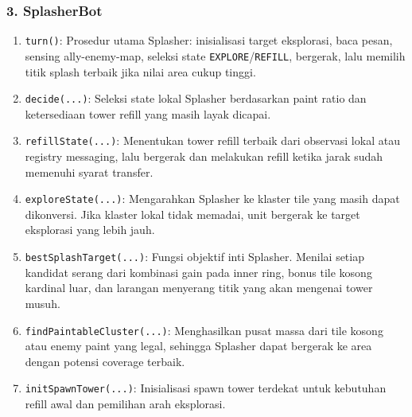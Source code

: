 \subsubsection{3. SplasherBot}
\begin{enumerate}
	\item \texttt{turn()}:
	      Prosedur utama Splasher: inisialisasi target eksplorasi, baca pesan, sensing ally-enemy-map, seleksi state \texttt{EXPLORE}/\texttt{REFILL}, bergerak, lalu memilih titik splash terbaik jika nilai area cukup tinggi.

	\item \texttt{decide(...)}:
	      Seleksi state lokal Splasher berdasarkan paint ratio dan ketersediaan tower refill yang masih layak dicapai.

	\item \texttt{refillState(...)}:
	      Menentukan tower refill terbaik dari observasi lokal atau registry messaging, lalu bergerak dan melakukan refill ketika jarak sudah memenuhi syarat transfer.

	\item \texttt{exploreState(...)}:
	      Mengarahkan Splasher ke klaster tile yang masih dapat dikonversi. Jika klaster lokal tidak memadai, unit bergerak ke target eksplorasi yang lebih jauh.

	\item \texttt{bestSplashTarget(...)}:
	      Fungsi objektif inti Splasher. Menilai setiap kandidat serang dari kombinasi gain pada inner ring, bonus tile kosong kardinal luar, dan larangan menyerang titik yang akan mengenai tower musuh.

	\item \texttt{findPaintableCluster(...)}:
	      Menghasilkan pusat massa dari tile kosong atau enemy paint yang legal, sehingga Splasher dapat bergerak ke area dengan potensi coverage terbaik.

	\item \texttt{initSpawnTower(...)}:
	      Inisialisasi spawn tower terdekat untuk kebutuhan refill awal dan pemilihan arah eksplorasi.
\end{enumerate}

